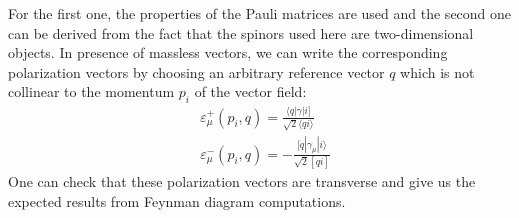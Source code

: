 For the first one, the properties of the Pauli matrices are used and the second one can be derived from the fact that the spinors used here are two-dimensional objects.
%
%
In presence of massless vectors, we can write the corresponding polarization vectors by choosing an arbitrary reference vector $q$ which is not collinear to the momentum $p_i$ of the vector field:
\begin{equation*}
\begin{split}
& \varepsilon^+_\mu (p_i, q) = \frac{\langle q | \gamma |i]}{\sqrt{2}\langle qi \rangle}
\\
& \varepsilon^-_\mu (p_i, q) = -\frac{[q|\gamma_\mu | i\rangle}{\sqrt{2}[qi]}
\end{split}
\end{equation*}
One can check that these polarization vectors are transverse and give us the expected results from Feynman diagram computations. 
%
%
